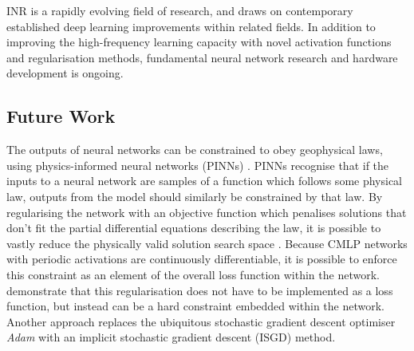 \documentclass[manuscript.tex]{subfiles}
\begin{document}
INR is a rapidly evolving field of research, and draws on contemporary established deep learning improvements within related fields.
In addition to improving the high-frequency learning capacity with novel activation functions and regularisation methods, fundamental neural network research and hardware development is ongoing.




\subsection{Future Work}
\label{sec:future}
The outputs of neural networks can be constrained to obey geophysical laws, using physics-informed neural networks (PINNs) \parencite{raissiPhysicsinformedNeuralNetworks2019}.
PINNs recognise that if the inputs to a neural network are samples of a function which follows some physical law, outputs from the model should similarly be constrained by that law.
By regularising the network with an objective function which penalises solutions that don't fit the partial differential equations describing the law, it is possible to vastly reduce the physically valid solution search space \parencite{raissiPhysicsinformedNeuralNetworks2019}.
Because CMLP networks with periodic activations are continuously differentiable, it is possible to enforce this constraint as an element of the overall loss function within the network.
\Textcite{sethiHardEnforcementPhysicsinformed2023} demonstrate that this regularisation does not have to be implemented as a loss function, but instead can be a hard constraint embedded within the network.
Another approach \parencite{liImplicitStochasticGradient2023} replaces the ubiquitous stochastic gradient descent optimiser \emph{Adam} with an implicit stochastic gradient descent (ISGD) method.
\end{document}
